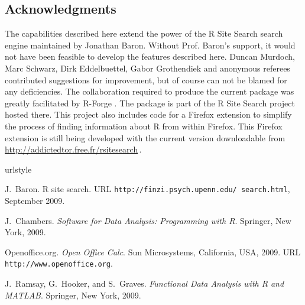 \documentclass[a4paper]{report}
\begin{document}
\begin{article}
\section{Acknowledgments}
The capabilities described here extend the power of the
R Site Search search engine maintained by Jonathan Baron.
Without Prof. Baron's support, it would not have been feasible
to develop the features described here. Duncan Murdoch, Marc Schwarz,
Dirk Eddelbuettel, Gabor Grothendiek and anonymous
referees contributed suggestions for improvement, but of course
can not be blamed for any deficiencies.  The collaboration
required to produce the current  package was greatly
facilitated by R-Forge \citep{RFORGE09URL}. The  package
is part of the R Site Search project hosted there.  This project
also includes code for a Firefox extension to simplify the process of
finding information about R from within Firefox.  This Firefox
extension is still being developed with the current version
downloadable from \url{http://addictedtor.free.fr/rsitesearch}\,.

\begin{thebibliography}{6}
\providecommand{\natexlab}[1]{#1}
\providecommand{\url}[1]{\texttt{#1}}
\expandafter\ifx\csname urlstyle\endcsname\relax
  \providecommand{\doi}[1]{doi: #1}\else
  \providecommand{\doi}{doi: \begingroup \urlstyle{rm}\Url}\fi

J.~Baron.
\newblock R site search.
\newblock URL \url{http://finzi.psych.upenn.edu/ search.html}, September 2009.

J.~Chambers.
\newblock \emph{Software for Data Analysis: Programming with R}.
\newblock Springer, New York, 2009.


{Openoffice.org}.
\newblock \emph{Open Office Calc}.
\newblock Sun Microsystems, California, USA, 2009.
\newblock URL \url{http://www.openoffice.org}.

J.~Ramsay, G.~Hooker, and S.~Graves.
\newblock \emph{Functional Data Analysis with R and MATLAB}.
\newblock Springer, New York, 2009.


\end{thebibliography}
\end{article}
\end{document}
